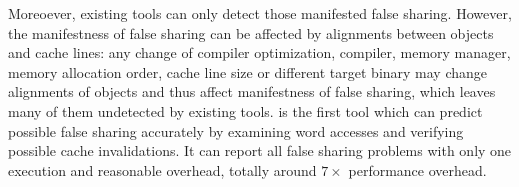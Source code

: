 Moreoever, existing tools can only detect those manifested false sharing.
However, the manifestness of false sharing can be affected by alignments between
objects and cache lines: any change of compiler optimization, compiler, memory manager, 
memory allocation order, cache line size or different target binary 
may change alignments of objects and thus affect manifestness of false sharing, 
which leaves many of them undetected by existing tools.
\Predator{} is the first tool which can predict possible false sharing 
accurately by examining word accesses and verifying possible cache invalidations.   
It can report all false sharing problems with only one execution and reasonable overhead, totally 
around $7\times$ performance overhead.

